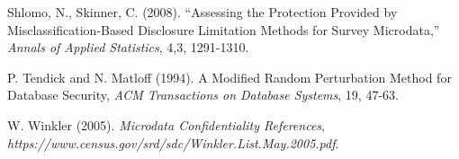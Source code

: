 \documentclass[11pt]{article}
\begin{document}
\begin{thebibliography}{}
Shlomo, N., Skinner, C. (2008).
``Assessing the Protection Provided by Misclassification-Based Disclosure
Limitation Methods for Survey Microdata,'' {\it Annals of Applied
Statistics}, 4,3, 1291-1310.

 P. Tendick and N. Matloff (1994).  A Modified Random
Perturbation Method for Database Security, {\it ACM Transactions on
Database Systems}, 19, 47-63.


 W. Winkler (2005). {\it Microdata Confidentiality
References}, {\it
https://www.census.gov/srd/sdc/Winkler.List.May.2005.pdf}.

\end{thebibliography}{}
\end{document}
